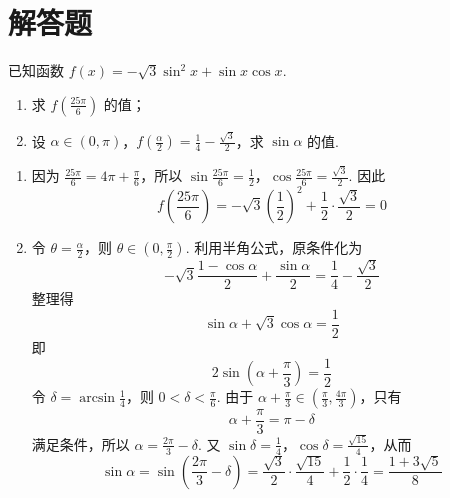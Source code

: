 \section{解答题}
\begin{problem}
已知函数 \( f(x) = -\sqrt{3}\sin^{2}x + \sin x\cos x \).
\begin{enumerate}
\item 求 \( f\left(\frac{25\pi}{6}\right) \) 的值；
\item 设 \(\alpha \in (0, \pi)\)，\(f\left(\frac{\alpha}{2}\right) = \frac{1}{4} - \frac{\sqrt{3}}{2}\)，求 \(\sin \alpha\) 的值.
\end{enumerate}

\begin{solution}
\begin{enumerate}
\item 因为 \(\frac{25\pi}{6}=4\pi+\frac{\pi}{6}\)，所以
\(\sin\frac{25\pi}{6}=\frac{1}{2}\)，\(\cos\frac{25\pi}{6}=\frac{\sqrt{3}}{2}\).
因此
\[
f\left(\frac{25\pi}{6}\right)
=-\sqrt{3}\left(\frac{1}{2}\right)^2+\frac{1}{2}\cdot\frac{\sqrt{3}}{2}=0
\]

\item 令 \(\theta=\frac{\alpha}{2}\)，则 \(\theta\in\left(0,\frac{\pi}{2}\right)\). 利用半角公式，原条件化为
\[
-\sqrt{3}\frac{1-\cos\alpha}{2}+\frac{\sin\alpha}{2}
=\frac{1}{4}-\frac{\sqrt{3}}{2}
\]
整理得
\[
\sin\alpha+\sqrt{3}\cos\alpha=\frac{1}{2}
\]
即
\[
2\sin\left(\alpha+\frac{\pi}{3}\right)=\frac{1}{2}
\]
令 \(\delta=\arcsin\frac{1}{4}\)，则 \(0<\delta<\frac{\pi}{6}\). 由于
\(\alpha+\frac{\pi}{3}\in\left(\frac{\pi}{3},\frac{4\pi}{3}\right)\)，只有
\[
\alpha+\frac{\pi}{3}=\pi-\delta
\]
满足条件，所以 \(\alpha=\frac{2\pi}{3}-\delta\). 又
\(\sin\delta=\frac14\)，\(\cos\delta=\frac{\sqrt{15}}4\)，从而
\[
\sin\alpha
=\sin\left(\frac{2\pi}{3}-\delta\right)
=\frac{\sqrt{3}}{2}\cdot\frac{\sqrt{15}}{4}
+\frac{1}{2}\cdot\frac{1}{4}
=\frac{1+3\sqrt{5}}{8}
\]
\end{enumerate}
\end{solution}
\end{problem}


